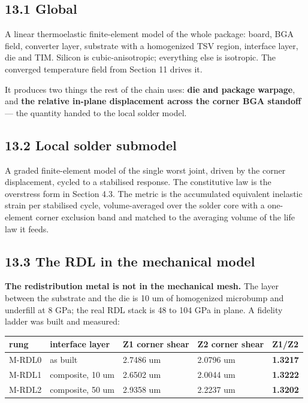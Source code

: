 \documentclass[10pt,]{article}
\begin{document}
\hypertarget{global}{%
\subsection{13.1 Global}\label{global}}

A linear thermoelastic finite-element model of the whole package: board,
BGA field, converter layer, substrate with a homogenized TSV region,
interface layer, die and TIM. Silicon is cubic-anisotropic; everything
else is isotropic. The converged temperature field from Section 11
drives it.

It produces two things the rest of the chain uses: \textbf{die and
package warpage}, and \textbf{the relative in-plane displacement across
the corner BGA standoff} --- the quantity handed to the local solder
model.

\hypertarget{local-solder-submodel}{%
\subsection{13.2 Local solder submodel}\label{local-solder-submodel}}

A graded finite-element model of the single worst joint, driven by the
corner displacement, cycled to a stabilised response. The constitutive
law is the overstress form in Section 4.3. The metric is the accumulated
equivalent inelastic strain per stabilised cycle, volume-averaged over
the solder core with a one-element corner exclusion band and matched to
the averaging volume of the life law it feeds.

\hypertarget{the-rdl-in-the-mechanical-model}{%
\subsection{13.3 The RDL in the mechanical
model}\label{the-rdl-in-the-mechanical-model}}

\textbf{The redistribution metal is not in the mechanical mesh.} The
layer between the substrate and the die is 10 um of homogenized
microbump and underfill at 8 GPa; the real RDL stack is 48 to 104 GPa in
plane. A fidelity ladder was built and measured:

\begin{longtable}[]{@{}lllll@{}}
\toprule
rung & interface layer & Z1 corner shear & Z2 corner shear &
Z1/Z2\tabularnewline
\midrule
\endhead
M-RDL0 & as built & 2.7486 um & 2.0796 um &
\textbf{1.3217}\tabularnewline
M-RDL1 & composite, 10 um & 2.6502 um & 2.0044 um &
\textbf{1.3222}\tabularnewline
M-RDL2 & composite, 50 um & 2.9358 um & 2.2237 um &
\textbf{1.3202}\tabularnewline
\bottomrule
\end{longtable}
\end{document}
